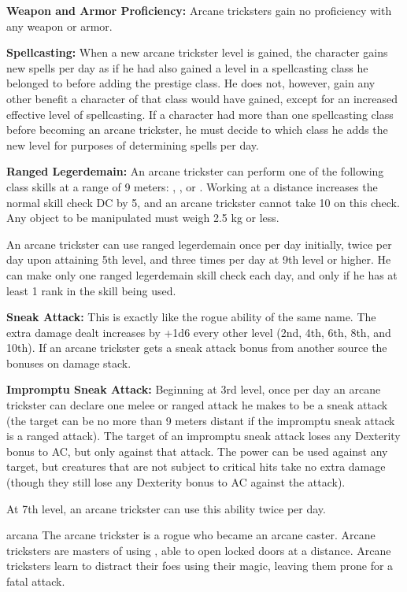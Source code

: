 {
\textbf{Weapon and Armor Proficiency:} Arcane tricksters gain no proficiency with any weapon or armor.

\textbf{Spellcasting:} When a new arcane trickster level is gained, the character gains new spells per day as if he had also gained a level in a spellcasting class he belonged to before adding the prestige class. He does not, however, gain any other benefit a character of that class would have gained, except for an increased effective level of spellcasting. If a character had more than one spellcasting class before becoming an arcane trickster, he must decide to which class he adds the new level for purposes of determining spells per day.

\textbf{Ranged Legerdemain:} An arcane trickster can perform one of the following class skills at a range of 9 meters: , , or . Working at a distance increases the normal skill check DC by 5, and an arcane trickster cannot take 10 on this check. Any object to be manipulated must weigh 2.5 kg or less.

An arcane trickster can use ranged legerdemain once per day initially, twice per day upon attaining 5th level, and three times per day at 9th level or higher. He can make only one ranged legerdemain skill check each day, and only if he has at least 1 rank in the skill being used.

\textbf{Sneak Attack:} This is exactly like the rogue ability of the same name. The extra damage dealt increases by +1d6 every other level (2nd, 4th, 6th, 8th, and 10th). If an arcane trickster gets a sneak attack bonus from another source the bonuses on damage stack.

\textbf{Impromptu Sneak Attack:} Beginning at 3rd level, once per day an arcane trickster can declare one melee or ranged attack he makes to be a sneak attack (the target can be no more than 9 meters distant if the impromptu sneak attack is a ranged attack). The target of an impromptu sneak attack loses any Dexterity bonus to AC, but only against that attack. The power can be used against any target, but creatures that are not subject to critical hits take no extra damage (though they still lose any Dexterity bonus to AC against the attack).

At 7th level, an arcane trickster can use this ability twice per day.
}
{}
{arcana}
{The arcane trickster is a rogue who became an arcane caster.}
{Arcane tricksters are masters of using , able to open locked doors at a distance.}
{Arcane tricksters learn to distract their foes using their magic, leaving them prone for a fatal attack.}